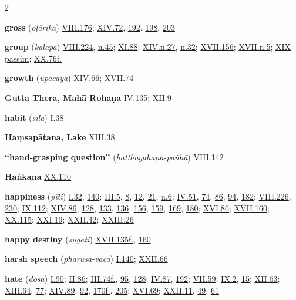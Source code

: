 \begin{multicols}{2}
\begin{vismHanging}
\par\textbf{gross} (\emph{oḷārika}) \hyperlink{VIII.176}{VIII.176}{}; \hyperlink{XIV.72}{XIV.72}{}, \hyperlink{XIV.192}{192}{}, \hyperlink{XIV.198}{198}{}, \hyperlink{XIV.203}{203}{}
\par\textbf{group} (\emph{kalāpa}) \hyperlink{VIII.224}{VIII.224}{}, \hyperlink{VIII.n45}{n.45}{}; \hyperlink{XI.88}{XI.88}{}; \hyperlink{XIV.n27}{XIV.n.27}{}, \hyperlink{XIV.n32}{n.32}{}; \hyperlink{XVII.156}{XVII.156}{}; \hyperlink{XVII.n5}{XVII.n.5}{}; \hyperlink{XIX}{XIX passim}{}; \hyperlink{XX.76}{XX.76f.}{}
\par\textbf{growth} (\emph{upacaya}) \hyperlink{XIV.66}{XIV.66}{}; \hyperlink{XVII.74}{XVII.74}{}
\par\textbf{Gutta Thera, Mahā Rohaṇa} \hyperlink{IV.135}{IV.135}{}; \hyperlink{XII.9}{XII.9}{}
\par\textbf{habit} (\emph{sīla}) \hyperlink{I.38}{I.38}{}
\par\textbf{Haṃsapātana, Lake} \hyperlink{XIII.38}{XIII.38}{}
\par\textbf{“hand-grasping question”} (\emph{hatthagahaṇa-pañhā}) \hyperlink{VIII.142}{VIII.142}{}
\par\textbf{Haṅkana} \hyperlink{XX.110}{XX.110}{}
\par\textbf{happiness} (\emph{pīti}) \hyperlink{I.32}{I.32}{}, \hyperlink{I.140}{140}{}; \hyperlink{III.5}{III.5}{}, \hyperlink{III.8}{8}{}, \hyperlink{III.12}{12}{}, \hyperlink{III.21}{21}{}, \hyperlink{III.n6}{n.6}{}; \hyperlink{IV.51}{IV.51}{}, \hyperlink{IV.74}{74}{}, \hyperlink{IV.86}{86}{}, \hyperlink{IV.94}{94}{}, \hyperlink{IV.182}{182}{}; \hyperlink{VIII.226}{VIII.226}{}, \hyperlink{VIII.230}{230}{}; \hyperlink{IX.112}{IX.112}{}; \hyperlink{XIV.86}{XIV.86}{}, \hyperlink{XIV.128}{128}{}, \hyperlink{XIV.133}{133}{}, \hyperlink{XIV.136}{136}{}, \hyperlink{XIV.156}{156}{}, \hyperlink{XIV.159}{159}{}, \hyperlink{XIV.169}{169}{}, \hyperlink{XIV.180}{180}{}; \hyperlink{XVI.86}{XVI.86}{}; \hyperlink{XVII.160}{XVII.160}{}; \hyperlink{XX.115}{XX.115}{}; \hyperlink{XXI.19}{XXI.19}{}; \hyperlink{XXII.42}{XXII.42}{}; \hyperlink{XXIII.26}{XXIII.26}{}
\par\textbf{happy destiny} (\emph{sugati}) \hyperlink{XVII.135}{XVII.135f.}{}, \hyperlink{XVII.160}{160}{}
\par\textbf{harsh speech} (\emph{pharusa-vācā}) \hyperlink{I.140}{I.140}{}; \hyperlink{XXII.66}{XXII.66}{}
\par\textbf{hate} (\emph{dosa}) \hyperlink{I.90}{I.90}{}; \hyperlink{II.86}{II.86}{}; \hyperlink{III.74}{III.74f.}{}, \hyperlink{III.95}{95}{}, \hyperlink{III.128}{128}{}; \hyperlink{IV.87}{IV.87}{}, \hyperlink{IV.192}{192}{}; \hyperlink{VII.59}{VII.59}{}; \hyperlink{IX.2}{IX.2}{}, \hyperlink{IX.15}{15}{}; \hyperlink{XII.63}{XII.63}{}; \hyperlink{XIII.64}{XIII.64}{}, \hyperlink{XIII.77}{77}{}; \hyperlink{XIV.89}{XIV.89}{}, \hyperlink{XIV.92}{92}{}, \hyperlink{XIV.170}{170f.}{}, \hyperlink{XIV.205}{205}{}; \hyperlink{XVI.69}{XVI.69}{}; \hyperlink{XXII.11}{XXII.11}{}, \hyperlink{XXII.49}{49}{}, \hyperlink{XXII.61}{61}{}

\end{vismHanging}
\end{multicols}
